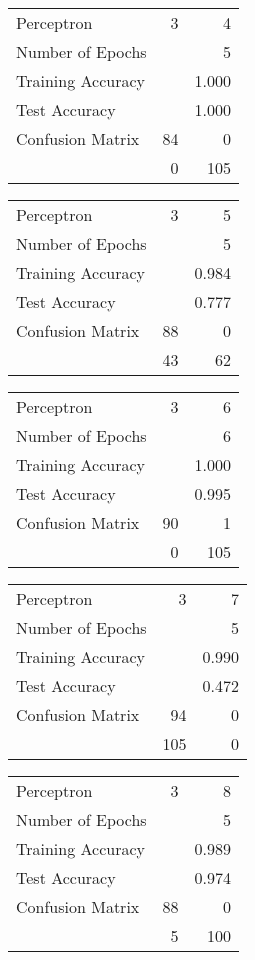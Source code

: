 \documentclass[11pt]{article}
\begin{document}
\begin{minipage}[t]{0.5\textwidth}
\begin{tabular}{|l | r r|}
\hline Perceptron & 3 & 4\\
Number of Epochs & & 5\\
Training Accuracy & & 1.000\\
Test Accuracy & & 1.000\\
Confusion Matrix & 84 & 0\\
 &0 & 105\\ \hline
\end{tabular}
\end{minipage}
\begin{minipage}[t]{0.5\textwidth}
\begin{tabular}{|l | r r|}
\hline Perceptron & 3 & 5\\
Number of Epochs & & 5\\
Training Accuracy & & 0.984\\
Test Accuracy & & 0.777\\
Confusion Matrix & 88 & 0\\
 &43 & 62\\ \hline
\end{tabular}
\end{minipage}
\begin{minipage}[t]{0.5\textwidth}
\begin{tabular}{|l | r r|}
\hline Perceptron & 3 & 6\\
Number of Epochs & & 6\\
Training Accuracy & & 1.000\\
Test Accuracy & & 0.995\\
Confusion Matrix & 90 & 1\\
 &0 & 105\\ \hline
\end{tabular}
\end{minipage}
\begin{minipage}[t]{0.5\textwidth}
\begin{tabular}{|l | r r|}
\hline Perceptron & 3 & 7\\
Number of Epochs & & 5\\
Training Accuracy & & 0.990\\
Test Accuracy & & 0.472\\
Confusion Matrix & 94 & 0\\
 &105 & 0\\ \hline
\end{tabular}
\end{minipage}
\begin{minipage}[t]{0.5\textwidth}
\begin{tabular}{|l | r r|}
\hline Perceptron & 3 & 8\\
Number of Epochs & & 5\\
Training Accuracy & & 0.989\\
Test Accuracy & & 0.974\\
Confusion Matrix & 88 & 0\\
 &5 & 100\\ \hline
\end{tabular}
\end{minipage}
\end{document}
